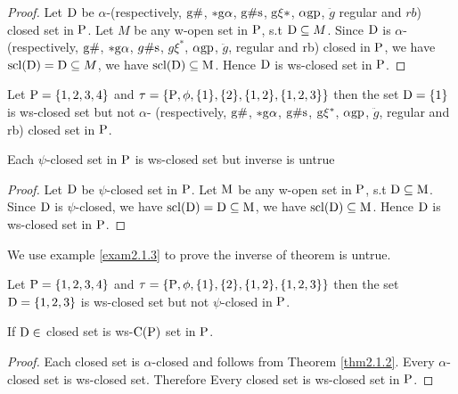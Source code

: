 \begin{proof}
Let $\mathrm{D}$ be $\alpha$-(respectively, $\mathrm{g}\#$, $*\mathrm{g}\alpha$, $\mathrm{g}\# \mathrm{s}$, $\mathrm{g}\xi*$, $\alpha\mathrm{g}\mathrm{p}$, $\ddot{g}$ regular and $rb$) closed set in $\mathrm{P}$. Let $M$ be any w-open set in $\mathrm{P}$, s.t $\mathrm{D} \subseteq M$. Since $\mathrm{D}$ is $\alpha$- (respectively, $\mathrm{g}\#$, $*\mathrm{g}\alpha$, $g\# \mathrm{s}$, $g\xi^{*}$, $\alpha\mathrm{g}\mathrm{p}$, $\ddot{g}$, regular and rb) closed in $\mathrm{P}$, we have $\mathrm{scl}(\mathrm{D}) = \mathrm{D} \subseteq M$, we have $\mathrm{scl}(\mathrm{D}) \subseteq \mathrm{M}$. Hence $\mathrm{D}$ is ws-closed set in $\mathrm{P}$.
\end{proof}

\begin{exm}\label{exam2.1.2}
Let $\mathrm{P}= \{1, 2, 3, 4\}$ and $\tau=\{\mathrm{P}, \phi, \{1\}, \{2\},\{1, 2\}, \{1, 2, 3\}\}$ then the set $\mathrm{D}=\{1\}$ is ws-closed set but not $\alpha$- (respectively, $\mathrm{g}\#$, $*\mathrm{g}\alpha$, $\mathrm{g}\# \mathrm{s}$, $\mathrm{g}\xi^{*}$, $\alpha\mathrm{g}\mathrm{p}$, $\ddot{g}$, regular and rb) closed set in $\mathrm{P}$.
\end{exm}

\begin{thm}\label{thm2.1.3}
Each $\psi$-closed set in $\mathrm{P}$ is ws-closed set but inverse is untrue
\end{thm}

\begin{proof}
Let $\mathrm{D}$ be $\psi$-closed set in $\mathrm{P}$. Let $\mathrm{M}$ be any w-open set in $\mathrm{P}$, s.t $\mathrm{D}\subseteq \mathrm{M}$. Since $\mathrm{D}$ is $\psi$-closed, we have $\mathrm{scl}(\mathrm{D})=\mathrm{D}\subseteq \mathrm{M}$, we have $\mathrm{scl}(\mathrm{D})\subseteq \mathrm{M}$. Hence $\mathrm{D}$ is ws-closed set in $\mathrm{P}$.
\end{proof}

We use example \ref{exam2.1.3} to prove the inverse of theorem is untrue.

\begin{exm}\label{exam2.1.3}
Let $\mathrm{P}= \{1, 2, 3, 4\}$ and  $\tau= \{\mathrm{P}, \phi, \{1\}, \{2\},\{1, 2\}, \{1, 2, 3\}\}$ then the set $\mathrm{D}= \{1,2,3\}$ is ws-closed set but not $\psi$-closed in $\mathrm{P}$.
\end{exm}

\begin{coro}\label{coro2.1.1}
If $\mathrm{D}\in$ closed set is ws-$\mathrm{C}(\mathrm{P})$ set in $\mathrm{P}$.
\end{coro}

\begin{proof}
Each closed set is $\alpha$-closed and follows from Theorem \ref{thm2.1.2}. Every $\alpha$-closed set is ws-closed set. Therefore Every closed set is ws-closed set in $\mathrm{P}$.
\end{proof}

